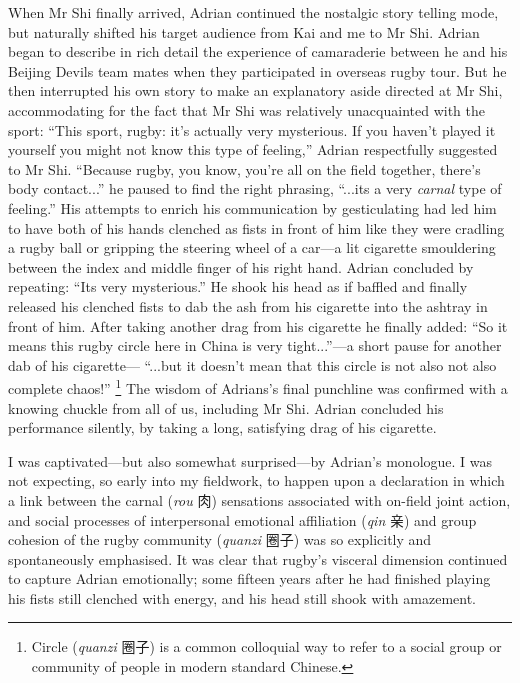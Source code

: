 \begin{CJK}{UTF8}{gbsn}
When Mr Shi finally arrived, Adrian continued the nostalgic story telling mode, but naturally shifted his target audience from Kai and me to Mr Shi.  Adrian began to describe in rich detail the experience of camaraderie between he and his Beijing Devils team mates when they participated in overseas rugby tour. But he then interrupted his own story to make an explanatory aside directed at Mr Shi, accommodating for the fact that Mr Shi was relatively unacquainted with the sport: ``This sport, rugby: it's actually very mysterious. If you haven't played it yourself you might not know this type of feeling,'' Adrian respectfully suggested to Mr Shi.  ``Because rugby, you know, you're all on the field together, there's body contact...'' he paused to find the right phrasing,  ``...its a very \textit{carnal} type of feeling.''  His attempts to enrich his communication by gesticulating had led him to have both of his hands clenched as fists in front of him like they were cradling a rugby ball or gripping the steering wheel of a car---a lit cigarette smouldering between the index and middle finger of his right hand.  Adrian concluded by repeating: ``Its very mysterious.'' He shook his head as if baffled and finally released his clenched fists to dab the ash from his cigarette into the ashtray in front of him.  After taking another drag from his cigarette he finally added: ``So it means this rugby circle here in China is very tight...''---a short pause for another dab of his cigarette--- ``...but it doesn't mean that this circle is not also not also complete chaos!''
  \footnote{Circle (\textit{quanzi} 圈子) is a common colloquial way to refer to a social group or community of people in modern standard Chinese.}
The wisdom of Adrians's final punchline was confirmed with a knowing chuckle from all of us, including Mr Shi. Adrian concluded his performance silently, by taking a long, satisfying drag of his cigarette.


I was captivated---but also somewhat surprised---by Adrian's monologue.  I was not expecting, so early into my fieldwork, to happen upon a declaration in which a link between the carnal (\textit{rou} 肉) sensations associated with on-field joint action, and social processes of interpersonal emotional affiliation (\textit{qin} 亲) and group cohesion of the rugby community (\textit{quanzi} 圈子) was so explicitly and spontaneously emphasised.  It was clear that rugby's visceral dimension continued to capture Adrian emotionally; some fifteen years after he had finished playing his fists still clenched with energy, and his head still shook with amazement.


\end{CJK}
